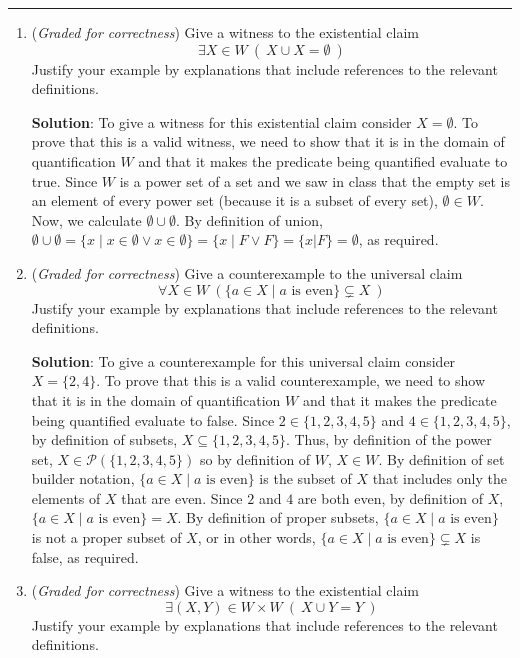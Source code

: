 \begin{enumerate}
   \rule{0.5\textwidth}{.4pt}
   
   
   \begin{enumerate}
   \item ({\it Graded for correctness}) Give a witness to the existential claim
   $$ \exists X \in W ~(~X \cup X = \emptyset~)$$
   Justify your example by explanations that include references to the relevant definitions.
   
   {\bf Solution}: To give a witness for this existential claim
   consider $X = \emptyset$. To prove that this is a valid witness, we need
   to show that it is in the domain of quantification $W$ and that 
   it makes the predicate being quantified evaluate to true. Since $W$ is a power set of a set
   and we saw in class that the empty set is an element of every power set (because
   it is a subset of every set), $\emptyset \in W$. Now, we calculate $\emptyset \cup \emptyset$.
   By definition of union, $\emptyset \cup \emptyset = \{ x \mid x \in \emptyset \lor x \in \emptyset\} = 
   \{x \mid F \lor F \}  =\{ x | F\} = \emptyset$, as required.

   \item ({\it Graded for correctness}) Give a counterexample to the universal claim
   $$ \forall X \in W ~( \{ a \in X \mid a \textrm{ is even} \} \subsetneq X~)$$
   Justify your example by explanations 
   that include references to the relevant definitions.
   
   {\bf Solution}: To give a counterexample for this universal claim
   consider $X = \{2,4\}$. To prove that this is a valid counterexample, we need
   to show that it is in the domain of quantification $W$ and that 
   it makes the predicate being quantified evaluate to false. Since $2 \in \{1,2,3,4,5\}$
   and $4 \in \{1,2,3,4,5\}$, by definition of subsets, $X \subseteq \{1,2,3,4,5\}$.
   Thus, by definition of the power set, $X \in \mathcal{P}(\{1,2,3,4,5\})$
   so by definition of $W$, $X \in W$. 
   By definition of set builder notation, $\{ a \in X \mid a \textrm{ is even} \}$
   is the subset of $X$ that includes only the elements of $X$ that are even. Since
   $2$ and $4$ are both even, by definition of $X$, $\{ a \in X \mid a \textrm{ is even} \} = X$.
   By definition of proper subsets, $\{ a \in X \mid a \textrm{ is even} \}$ is not a 
   proper subset of $X$, or in other words, $\{ a \in X \mid a \textrm{ is even} \} \subsetneq X$ is 
   false, as required.

   \item  ({\it Graded for correctness}) Give a witness to the existential claim
   $$ \exists (X,Y) \in W \times W ~(~X \cup Y = Y~)$$
   Justify your example by explanations that include references to the relevant definitions.


\end{enumerate}
\end{enumerate}
